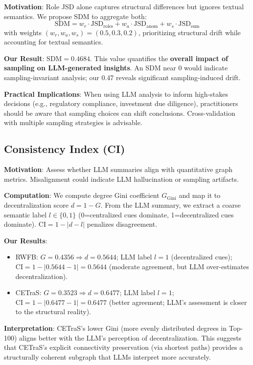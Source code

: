 \textbf{Motivation}: Role JSD alone captures structural differences but ignores textual semantics. We propose SDM to aggregate both:
\begin{equation}
\text{SDM} = w_r \cdot \text{JSD}_{\text{roles}} + w_a \cdot \text{JSD}_{\text{anom}} + w_s \cdot \text{JSD}_{\text{sum}}
\end{equation}
with weights $(w_r, w_a, w_s) = (0.5, 0.3, 0.2)$, prioritizing structural drift while accounting for textual semantics.

\textbf{Our Result}: $\text{SDM} = 0.4684$. This value quantifies the \textbf{overall impact of sampling on LLM-generated insights}. An SDM near 0 would indicate sampling-invariant analysis; our 0.47 reveals significant sampling-induced drift.

\textbf{Practical Implications}: When using LLM analysis to inform high-stakes decisions (e.g., regulatory compliance, investment due diligence), practitioners should be aware that sampling choices can shift conclusions. Cross-validation with multiple sampling strategies is advisable.

\subsection{Consistency Index (CI)}

\textbf{Motivation}: Assess whether LLM summaries align with quantitative graph metrics. Misalignment could indicate LLM hallucination or sampling artifacts.

\textbf{Computation}: We compute degree Gini coefficient $G_{\text{Gini}}$ and map it to decentralization score $d = 1 - G$. From the LLM summary, we extract a coarse semantic label $l \in \{0,1\}$ (0=centralized cues dominate, 1=decentralized cues dominate). $\text{CI} = 1 - |d - l|$ penalizes disagreement.

\textbf{Our Results}:
\begin{itemize}
    \item RWFB: $G=0.4356 \Rightarrow d=0.5644$; LLM label $l=1$ (decentralized cues); $\text{CI}=1-|0.5644-1|=0.5644$ (moderate agreement, but LLM over-estimates decentralization).
    \item CETraS: $G=0.3523 \Rightarrow d=0.6477$; LLM label $l=1$; $\text{CI}=1-|0.6477-1|=0.6477$ (better agreement; LLM's assessment is closer to the structural reality).
\end{itemize}

\textbf{Interpretation}: CETraS's lower Gini (more evenly distributed degrees in Top-100) aligns better with the LLM's perception of decentralization. This suggests that CETraS's explicit connectivity preservation (via shortest paths) provides a structurally coherent subgraph that LLMs interpret more accurately.

